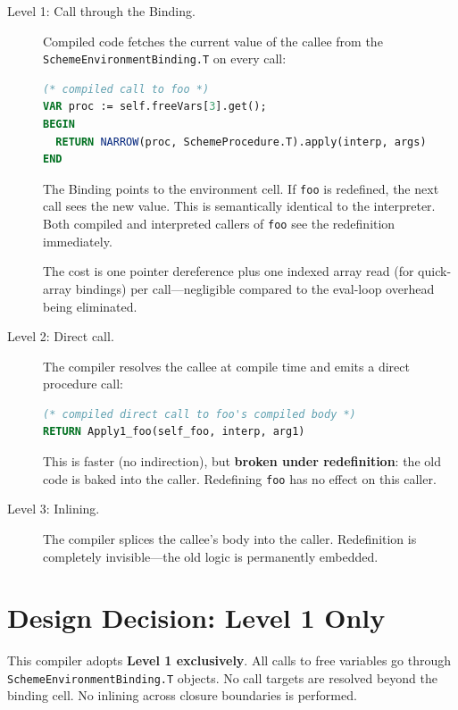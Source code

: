 \documentclass[12pt]{report}
\begin{document}
\begin{description}
\item[Level 1: Call through the Binding.]
  Compiled code fetches the current value of the callee from the
  \texttt{SchemeEnvironmentBinding.T} on every call:

\begin{lstlisting}[language=Modula3]
(* compiled call to foo *)
VAR proc := self.freeVars[3].get();
BEGIN
  RETURN NARROW(proc, SchemeProcedure.T).apply(interp, args)
END
\end{lstlisting}

  The Binding points to the environment cell.  If \texttt{foo} is
  redefined, the next call sees the new value.  This is semantically
  identical to the interpreter.  Both compiled and interpreted
  callers of \texttt{foo} see the redefinition immediately.

  The cost is one pointer dereference plus one indexed array read
  (for quick-array bindings) per call---negligible compared to the
  eval-loop overhead being eliminated.

\item[Level 2: Direct call.]
  The compiler resolves the callee at compile time and emits a
  direct procedure call:

\begin{lstlisting}[language=Modula3]
(* compiled direct call to foo's compiled body *)
RETURN Apply1_foo(self_foo, interp, arg1)
\end{lstlisting}

  This is faster (no indirection), but \textbf{broken under
  redefinition}: the old code is baked into the caller.  Redefining
  \texttt{foo} has no effect on this caller.

\item[Level 3: Inlining.]
  The compiler splices the callee's body into the caller.
  Redefinition is completely invisible---the old logic is
  permanently embedded.
\end{description}

\section{Design Decision: Level 1 Only}

This compiler adopts \textbf{Level 1 exclusively}.  All calls to
free variables go through \texttt{SchemeEnvironmentBinding.T}
objects.  No call targets are resolved beyond the binding cell.
No inlining across closure boundaries is performed.
\end{document}
